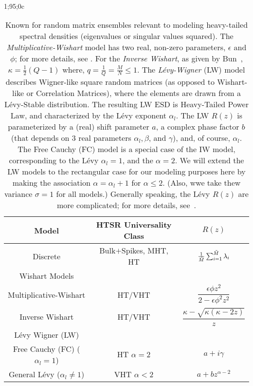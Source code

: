 1;95;0c%
\begin{table}[h!]
  \centering
  \renewcommand{\arraystretch}{1.25} %
\begin{tabular}{|c|c|c|}
  \hline
  Model & \textbf{HTSR Universality Class} & \textbf{$R(z)$}\\  \hline
  \hline
  Discrete & Bulk$+$Spikes, MHT, HT & $\tfrac{1}{\tilde{M}}\sum_{i=1}^{\tilde{M}}\lambda_{i}$   \\ \hline
  \hline
  Wishart Models & &\\ \hline
  Multiplicative-Wishart & HT/VHT& $\dfrac{\epsilon\phi z^2}{2 - \epsilon\phi^2 z^2}$ \\  \hline
  Inverse Wishart & HT/VHT &  $\dfrac{\kappa-\sqrt{\kappa(\kappa-2z)}}{z}$   \\  \hline
  \hline
  L\'evy Wigner (LW) &   & \\  \hline
  Free Cauchy (FC) ($\alpha_{l}=1$) & HT $\alpha=2$ & $a+i\gamma$ \\ \hline
  General L\'evy  ($\alpha_{l}\ne 1$) & VHT $\alpha<2$   & $a+bz^{\alpha-2}$ \\  \hline
\end{tabular}
  \caption{Known \RTransforms for random matrix ensembles relevant to modeling heavy-tailed spectral densities (eigenvalues or singular values squared).
    The \emph{Multiplicative-Wishart} model has two real, non-zero parameters, $\epsilon$ and $\phi$; for more details, see \cite{Pennington2017}.
  For the \emph{Inverse Wishart}, as given by Bun~\cite{BunThesis}, $\kappa=\frac{1}{2}(Q-1)$ where, $q=\frac{1}{Q}=\frac{M}{N}\le 1$.
  The \emph{L\'evy-Wigner} (LW) model describes Wigner-like square random matrices
  (as opposed to Wishart-like or Correlation Matrices), where the elements are drawn from a L\'evy-Stable distribution.
  The resulting LW ESD is Heavy-Tailed Power Law, and characterized by the L\'evy exponent $\alpha_{l}$.
  The LW $R(z)$ is parameterized by a (real) shift parameter $a$,
  a complex phase factor $b$ (that depends on 3 real parameters   $\alpha_{l}, \beta$, and $\gamma$),
  and, of course, $\alpha_{l}$.
  The Free Cauchy (FC) model is a special case of the IW model, corresponding to the L\'evy $\alpha_{l}=1$, and the \HTSR $\alpha=2$. 
  We will extend the LW models to the rectangular case for our modeling purposes here by making
  the association   $\alpha = \alpha_{l}+1$ for $\alpha\le 2$.
   (Also, wwe take thew variance $\sigma=1$ for all models.)
   Generally speaking, the L\'evy $R(z)$ are more complicated; 
   for more details, see~\cite{BJNx01_TR,BJNx06_TR,BJ09_TR}.
}
\label{tab:known_r_transforms}
\end{table}

